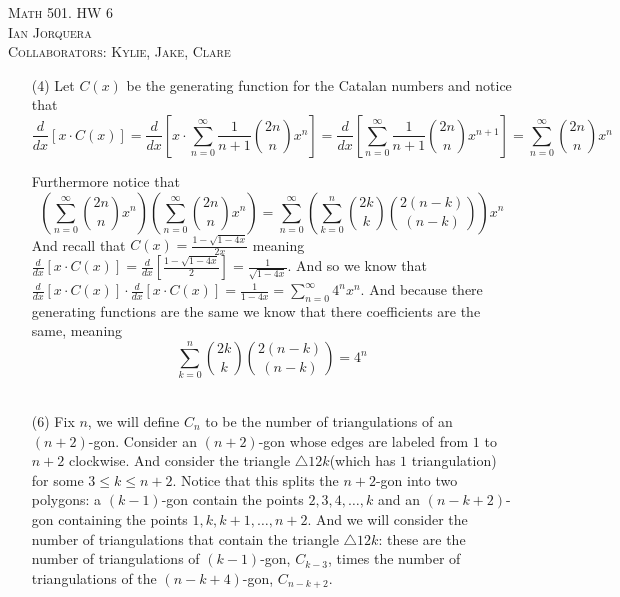 \documentclass[12pt]{amsart}
\theoremstyle{definition}
\begin{document}
\begin{center}
    \textsc{Math 501. HW 6\\ Ian Jorquera\\ Collaborators: Kylie, Jake, Clare}
\end{center}
\vspace{1em}


\begin{itemize}

\item[(4)] %
Let $C(x)$ be the generating function for the Catalan numbers and notice that 
$$\frac{d}{dx}\left[ x\cdot C(x) \right]=\frac{d}{dx}\left[ x\cdot \sum_{n=0}^{\infty} \frac{1}{n+1} {2n \choose n}x^{n} \right]=\frac{d}{dx} \left[ \sum_{n=0}^{\infty} \frac{1}{n+1} {2n \choose n}x^{n+1} \right] = \sum_{n=0}^{\infty} {2n \choose n}x^{n}$$\faHandLizardO

Furthermore notice that
$$\left(\sum_{n=0}^{\infty} {2n \choose n}x^{n}\right)\left(\sum_{n=0}^{\infty} {2n \choose n}x^{n}\right)=\sum_{n=0}^{\infty} \left(\sum_{k=0}^n {2k \choose k}{2(n-k) \choose (n-k)}\right)x^n$$
And recall that $C(x)=\frac{1-\sqrt{1-4x}}{2x}$ meaning $\frac{d}{dx}\left[ x\cdot C(x) \right]=\frac{d}{dx}\left[ \frac{1-\sqrt{1-4x}}{2} \right]=\frac{1}{\sqrt{1-4x}}$. And so we know that $\frac{d}{dx}\left[ x\cdot C(x) \right]\cdot \frac{d}{dx}\left[ x\cdot C(x) \right]=\frac{1}{1-4x}=\sum_{n=0}^\infty4^nx^n$. And because there generating functions are the same we know that there coefficients are the same, meaning 
$$\sum_{k=0}^n {2k \choose k}{2(n-k) \choose (n-k)}=4^n$$\\

\item[(6)] %
Fix $n$, we will define $C_n$ to be the number of triangulations of an $(n+2)$-gon. Consider an $(n+2)$-gon whose edges are labeled from $1$ to $n+2$ clockwise. And consider the triangle $\triangle{12k}$(which has $1$ triangulation) for some $3\leq k\leq n+2$. Notice that this splits the $n+2$-gon into two polygons: a $(k-1)$-gon contain the points $2,3,4,\dots,k$ and an $(n-k+2)$-gon containing the points $1,k,k+1,\dots,n+2$. And we will consider the number of triangulations that contain the triangle $\triangle 12k$: these are the number of triangulations of $(k-1)$-gon, $C_{k-3}$, times the number of triangulations of the $(n-k+4)$-gon, $C_{n-k+2}$.\\


\end{itemize}
\end{document}
